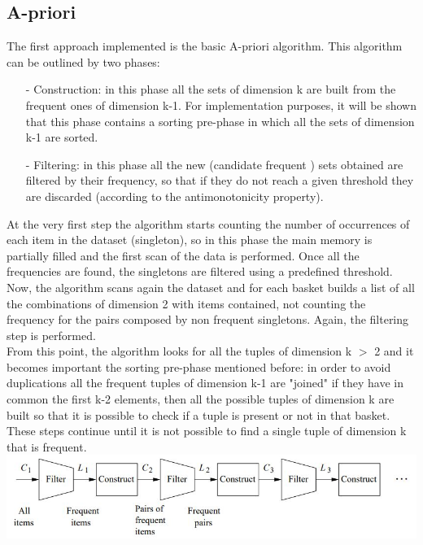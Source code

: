 \documentclass[14pt]{extarticle}
\begin{document}
\subsection{A-priori}
The first approach implemented is the basic A-priori algorithm. This algorithm can be outlined by two phases:
\begin{itemize}[leftmargin=*]
	\vspace{-0.4cm}\item[-] Construction: in this phase all the sets of dimension k are built from the frequent ones of dimension k-1. For implementation purposes, it will be shown that this phase contains a sorting pre-phase in which all the sets of dimension k-1 are sorted.
	\vspace{-0.4cm}\item[-] Filtering: in this phase all the new (candidate frequent ) sets obtained are filtered by their frequency, so that if they do not reach a given threshold they are discarded (according to the antimonotonicity property).
\end{itemize}
At the very first step the algorithm starts counting the number of occurrences of each item in the dataset (singleton), so in this phase the main memory is partially filled and the first scan of the data is performed. Once all the frequencies are found, the singletons are filtered using a predefined threshold.\\
Now, the algorithm scans again the dataset and for each basket builds a list of all the combinations of dimension 2 with items contained, not counting the frequency for the pairs composed by non frequent singletons. Again, the filtering step is performed.\\
From this point, the algorithm looks for all the tuples of dimension k $>$ 2 and it becomes important the sorting pre-phase mentioned before: in order to avoid duplications all the frequent tuples of dimension k-1 are "joined" if they have in common the first k-2 elements, then all the possible tuples of dimension k are built so that it is possible to check if a tuple is present or not in that basket.\\
These steps continue until it is not possible to find a single tuple of dimension k that is frequent.\\
\includegraphics[scale=0.53]{apriori.jpg}
\end{document}
